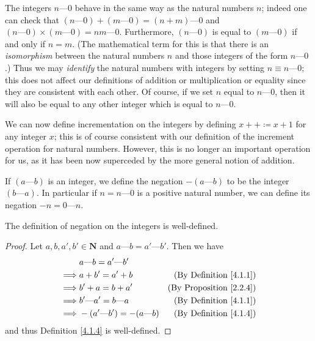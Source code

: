 \begin{note}
    The integers \(n \text{---} 0\) behave in the same way as the natural numbers \(n\);
    indeed one can check that \((n \text{---} 0) + (m \text{---} 0) = (n + m) \text{---} 0\) and \((n \text{---} 0) \times (m \text{---} 0) = nm \text{---} 0\).
    Furthermore, \((n \text{---} 0)\) is equal to \((m \text{---} 0)\) if and only if \(n = m\).
    (The mathematical term for this is that there is an \emph{isomorphism} between the natural numbers \(n\) and those integers of the form \(n \text{---} 0\).)
    Thus we may \emph{identify} the natural numbers with integers by setting \(n \equiv n \text{---} 0\);
    this does not affect our definitions of addition or multiplication or equality since they are consistent with each other.
    Of course, if we set \(n\) equal to \(n \text{---} 0\), then it will also be equal to any other integer which is equal to \(n \text{---} 0\).
\end{note}

\begin{note}
    We can now define incrementation on the integers by defining \(x++ \coloneqq x + 1\) for any integer \(x\);
    this is of course consistent with our definition of the increment operation for natural numbers.
    However, this is no longer an important operation for us, as it has been now superceded by the more general notion of addition.
\end{note}

\begin{definition}\label{4.1.4}
    If \((a \text{---} b)\) is an integer, we define the negation \(-(a \text{---} b)\) to be the integer \((b \text{---} a)\).
    In particular if \(n = n \text{---} 0\) is a positive natural number, we can define its negation \(-n = 0 \text{---} n\).
\end{definition}

\begin{additional corollary}\label{ac 4.1.2}
The definition of negation on the integers is well-defined.
\end{additional corollary}

\begin{proof}
    Let \(a, b, a', b' \in \mathbf{N}\) and \(a \text{---} b = a' \text{---} b'\).
    Then we have
    \begin{align*}
                 & a \text{---} b = a' \text{---} b'                                             \\
        \implies & a + b' = a' + b                         & \text{(By Definition \ref{4.1.1})}  \\
        \implies & b' + a = b + a'                         & \text{(By Proposition \ref{2.2.4})} \\
        \implies & b' \text{---} a' = b \text{---} a       & \text{(By Definition \ref{4.1.1})}  \\
        \implies & -(a' \text{---} b') = -(a \text{---} b) & \text{(By Definition \ref{4.1.4})}  \\
    \end{align*}
    and thus Definition \ref{4.1.4} is well-defined.
\end{proof}

